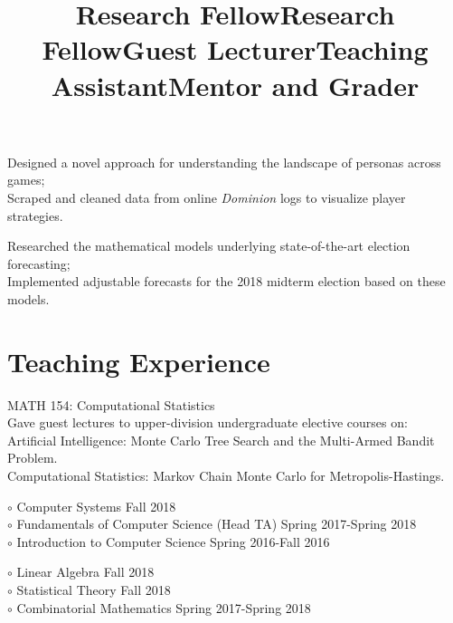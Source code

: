 \documentclass[margin]{res}
\begin{document}
\begin{resume}
\title{\textbf{Research Fellow}}
\begin{position}
Designed a novel approach for understanding the landscape of personas across games;\\
Scraped and cleaned data from online \emph{Dominion} logs to visualize player strategies.
\end{position}

\title{\textbf{Research Fellow}}
\begin{position}
Researched the mathematical models underlying state-of-the-art election forecasting;\\
Implemented adjustable forecasts for the 2018 midterm election based on these models.
\end{position}

\section{Teaching Experience}
\title{\textbf{Guest Lecturer}}
\begin{position}
MATH 154: Computational Statistics\\
Gave guest lectures to upper-division undergraduate elective courses on:\\
Artificial Intelligence: Monte Carlo Tree Search and the Multi-Armed Bandit Problem.\\
Computational Statistics: Markov Chain Monte Carlo for Metropolis-Hastings.
\end{position}

\dates{}
\title{\textbf{Teaching Assistant}}
\begin{position}
$\circ$ Computer Systems \hfill Fall 2018\\
$\circ$ Fundamentals of Computer Science (Head TA) \hfill Spring 2017-Spring 2018\\
$\circ$ Introduction to Computer Science \hfill Spring 2016-Fall 2016

\end{position}

\dates{}
\title{\textbf{Mentor and Grader}}
\begin{position}
$\circ$ Linear Algebra \hfill Fall 2018\\
$\circ$ Statistical Theory \hfill Fall 2018\\
$\circ$ Combinatorial Mathematics \hfill Spring 2017-Spring 2018


\end{position}
\end{resume}
\end{document}
